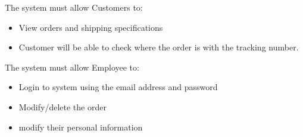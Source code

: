 The system must allow Customers to:
\begin{itemize}
	\item View orders and shipping specifications
	\item Customer will be able to check where the order is with the tracking number.
\end{itemize}

The system must allow Employee to:
\begin{itemize}
	\item Login to system using the email address and password
	\item Modify/delete the order
	\item modify their personal information
\end{itemize}
